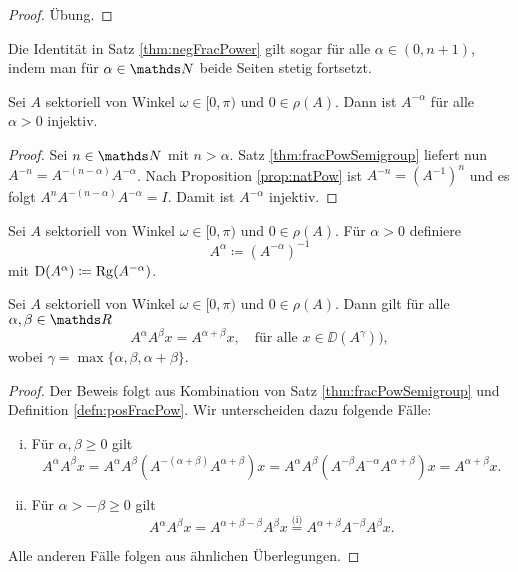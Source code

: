 \begin{proof}
  Übung.
\end{proof}

\begin{kor}
  \label{kor:negFracPower}
  Die Identität in Satz \ref{thm:negFracPower} gilt sogar für alle $\alpha \in (0,n+1)$, indem man für $\alpha \in \N$ beide Seiten stetig fortsetzt.
\end{kor}

\begin{prop}
  Sei $A$ sektoriell von Winkel $\omega \in [0,\pi)$ und $0 \in \rho(A)$.
  Dann ist $A^{-\alpha}$ für alle $\alpha > 0$ injektiv.
\end{prop}

\begin{proof}
  Sei $n \in \N$ mit $n > \alpha$.
  Satz \ref{thm:fracPowSemigroup} liefert nun $A^{-n} = A^{-(n - \alpha)}A^{-\alpha}$.
  Nach Proposition \ref{prop:natPow} ist $A^{-n} = (A^{-1})^n$ und es folgt $A^n A^{-(n - \alpha)} A^{-\alpha} = I$.
  Damit ist $A^{-\alpha}$ injektiv.
\end{proof}

\begin{defn}
  \label{defn:posFracPow}
  Sei $A$ sektoriell von Winkel $\omega \in [0,\pi)$ und $0 \in \rho(A)$.
  Für $\alpha > 0$ definiere 
  $$
  A^\alpha \coloneqq (A^{-\alpha})^{-1}
  $$
  mit $\mathrm{D}(A^\alpha) \coloneqq \operatorname{Rg}(A^{-\alpha})$.
\end{defn}

\begin{thm}
  Sei $A$ sektoriell von Winkel $\omega \in [0,\pi)$ und $0 \in \rho(A)$.
  Dann gilt für alle $\alpha, \beta \in \R$
  $$
    A^\alpha A^\beta x = A^{\alpha + \beta} x, \quad\text{für alle } x \in \DD(A^\gamma)),
  $$
  wobei $\gamma = \max\{\alpha, \beta, \alpha + \beta\}$.
\end{thm}

\begin{proof}
  Der Beweis folgt aus Kombination von Satz \ref{thm:fracPowSemigroup} und Definition \ref{defn:posFracPow}.
  Wir unterscheiden dazu folgende Fälle:
  \begin{enumerate}[(i)]
    \item Für $\alpha, \beta \geq 0$ gilt
  \[
  A^\alpha A^\beta x 
  = A^\alpha A^\beta (A^{-(\alpha + \beta)} A^{\alpha + \beta}) x
  = A^\alpha A^\beta (A^{-\beta} A^{-\alpha} A^{\alpha + \beta} ) x 
  = A^{\alpha + \beta} x. 
  \]
\item Für $\alpha > -\beta \geq 0$ gilt
  \[
    A^\alpha A^\beta x
      = A^{\alpha + \beta - \beta} A^\beta x
      \overset{\text{(i)}}{=} A^{\alpha + \beta} A^{-\beta} A^\beta x.
    \]
  \end{enumerate}
  Alle anderen Fälle folgen aus ähnlichen Überlegungen.
\end{proof}

